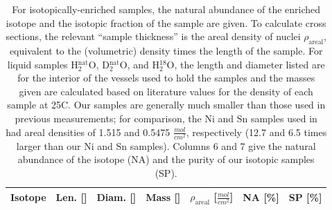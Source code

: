 \begin{table}[tb]
    \caption[Physical characteristics of samples used for neutron \tot\
    measurements]
    {
        For isotopically-enriched samples, the natural abundance
        of the enriched isotope and the isotopic fraction of the sample are
        given. To calculate cross sections, the relevant ``sample thickness'' is the areal
        density of nuclei $\rho_{\text{areal}}$, equivalent to
        the (volumetric) density times the length of the sample. For liquid
        samples H$_{2}^{\text{nat}}$O, D$_{2}^{\text{nat}}$O, and H$_{2}^{18}$O,
        the length and diameter listed are for the interior of the vessels
        used to hold the samples and the masses given are calculated based on 
        literature values for the density of each sample at 25\textdegree{}C.
        Our samples are generally much smaller than those used in previous
        measurements; for comparison, the Ni and Sn samples used in \cite{Abfalterer2001,
        Finlay1993} had areal densities of 1.515 and 0.5475
        $\frac{mol}{cm^{2}}$, respectively (12.7 and 6.5 times larger than our
        Ni and Sn samples). Columns 6 and 7 give the natural abundance of the
        isotope (NA) and the purity of our isotopic samples (SP).
    }
    \label{SampleCharacteristics}
    \begin{center}
        \begin{tabular}{ c c c c c c c }
            \toprule
            Isotope & Len. [\milli\meter] & Diam. [\milli\meter]
            & Mass [\gram] & $\rho_{\text{areal}}$
            [$\frac{mol}{cm^{2}}$] & NA [\%] & SP 
            [\%]\\
            \midrule


\end{tabular}
\end{center}
\end{table}
